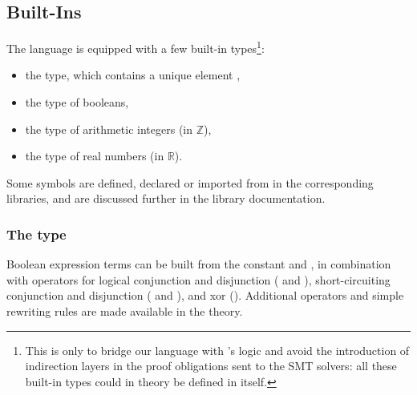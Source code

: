 \subsection{Built-Ins}
The language is equipped with a few built-in types\footnote{This is only to
bridge our language with \WhyThree's logic and avoid the introduction of
indirection layers in the proof obligations sent to the SMT solvers: all these
built-in types could in theory be defined in \EasyCrypt itself.}:
\begin{itemize}\itemsep-.5em
\item the  type, which
        contains a unique element
        ,
\item the  type of booleans,
\item the  type of arithmetic integers (in $\mathbb{Z}$),
\item the  type of real numbers (in $\mathbb{R}$).
\end{itemize}

Some symbols are defined, declared or imported from \WhyThree in the
corresponding libraries, and are discussed further in the library documentation.

\subsubsection*{The  type}
Boolean expression terms can be built from the constant
 and
, in combination
with operators for logical conjunction and disjunction
(\rawec{/\\} and
\rawec{\\\/}),
short-circuiting conjunction and disjunction
(\rawec{\&\&}
and
\rawec{||}),
and xor
(\rawec{\^\^}).
Additional operators and simple rewriting rules are made available in the
 theory.

